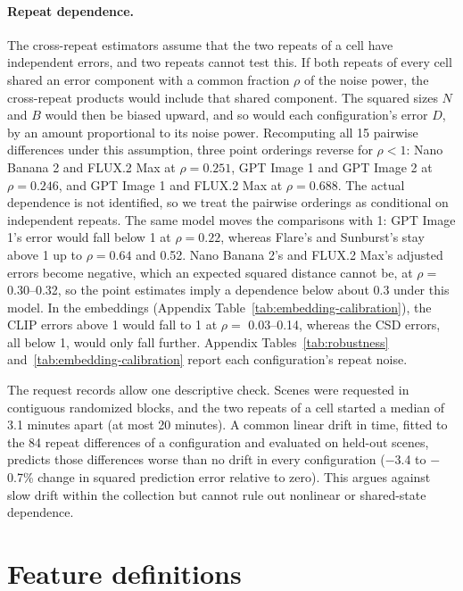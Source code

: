 \paragraph{Repeat dependence.}
The cross-repeat estimators assume that the two repeats of a cell have independent errors, and
two repeats cannot test this. If both repeats of every cell shared an error component with a
common fraction $\rho$ of the noise power, the cross-repeat products would include that shared
component. The squared sizes $N$ and $B$ would then be biased upward, and so would each
configuration's error $D$, by an amount proportional to its noise power. Recomputing all 15
pairwise differences under this assumption, three point orderings reverse for $\rho<1$: Nano
Banana 2 and FLUX.2 Max at $\rho=0.251$, GPT Image 1 and GPT Image 2 at $\rho=0.246$, and GPT
Image 1 and FLUX.2 Max at $\rho=0.688$. The actual dependence is not identified, so we treat the
pairwise orderings as conditional on independent repeats. The same model moves the comparisons
with 1: GPT Image 1's error would fall below 1 at $\rho=0.22$, whereas Flare's and Sunburst's stay
above 1 up to $\rho=0.64$ and 0.52. Nano Banana 2's and FLUX.2 Max's adjusted errors become negative,
which an expected squared distance cannot be, at $\rho=$ 0.30--0.32, so the point estimates imply a
dependence below about 0.3 under this model. In the embeddings (Appendix
Table~\ref{tab:embedding-calibration}), the CLIP errors above 1 would fall to 1 at $\rho=$
0.03--0.14, whereas the CSD errors, all below 1, would only fall further. Appendix
Tables~\ref{tab:robustness} and~\ref{tab:embedding-calibration} report each configuration's repeat
noise.

The request records allow one descriptive check. Scenes were requested in contiguous randomized
blocks, and the two repeats of a cell started a median of 3.1 minutes apart (at most 20 minutes).
A common linear drift in time, fitted to the 84 repeat differences of a configuration and
evaluated on held-out scenes, predicts those differences worse than no drift in every
configuration ($-$3.4 to $-$0.7\% change in squared prediction error relative to zero). This
argues against slow drift within the collection but cannot rule out nonlinear or shared-state
dependence.

\FloatBarrier
\section{Feature definitions}\label{app:features}

